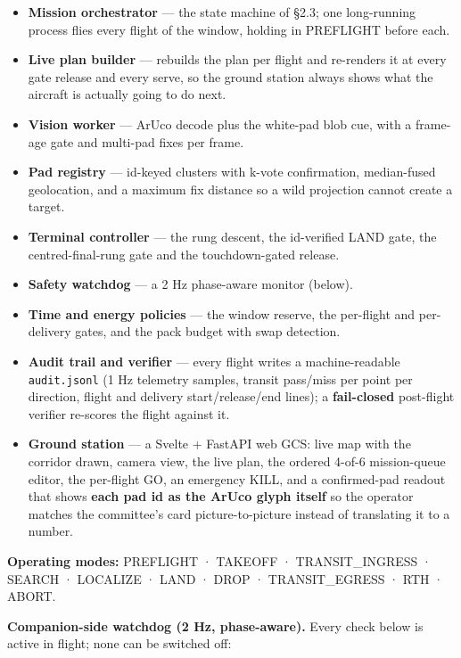 \documentclass[
  10pt,
  a4paper,
  titlepage]{article}
\providecommand{\tightlist}{%
  \setlength{\itemsep}{0pt}\setlength{\parskip}{0pt}}
\begin{document}
\begin{itemize}
\tightlist
\item
  \textbf{Mission orchestrator} --- the state machine of §2.3; one
  long-running process flies every flight of the window, holding in
  PREFLIGHT before each.
\item
  \textbf{Live plan builder} --- rebuilds the plan per flight and
  re-renders it at every gate release and every serve, so the ground
  station always shows what the aircraft is actually going to do next.
\item
  \textbf{Vision worker} --- ArUco decode plus the white-pad blob cue,
  with a frame-age gate and multi-pad fixes per frame.
\item
  \textbf{Pad registry} --- id-keyed clusters with k-vote confirmation,
  median-fused geolocation, and a maximum fix distance so a wild
  projection cannot create a target.
\item
  \textbf{Terminal controller} --- the rung descent, the id-verified
  LAND gate, the centred-final-rung gate and the touchdown-gated
  release.
\item
  \textbf{Safety watchdog} --- a 2 Hz phase-aware monitor (below).
\item
  \textbf{Time and energy policies} --- the window reserve, the
  per-flight and per-delivery gates, and the pack budget with swap
  detection.
\item
  \textbf{Audit trail and verifier} --- every flight writes a
  machine-readable \texttt{audit.jsonl} (1 Hz telemetry samples, transit
  pass/miss per point per direction, flight and delivery
  start/release/end lines); a \textbf{fail-closed} post-flight verifier
  re-scores the flight against it.
\item
  \textbf{Ground station} --- a Svelte + FastAPI web GCS: live map with
  the corridor drawn, camera view, the live plan, the ordered 4-of-6
  mission-queue editor, the per-flight GO, an emergency KILL, and a
  confirmed-pad readout that shows \textbf{each pad id as the ArUco
  glyph itself} so the operator matches the committee's card
  picture-to-picture instead of translating it to a number.
\end{itemize}

\textbf{Operating modes:} PREFLIGHT · TAKEOFF · TRANSIT\_INGRESS ·
SEARCH · LOCALIZE · LAND · DROP · TRANSIT\_EGRESS · RTH · ABORT.

\textbf{Companion-side watchdog (2 Hz, phase-aware).} Every check below
is active in flight; none can be switched off:
\end{document}
